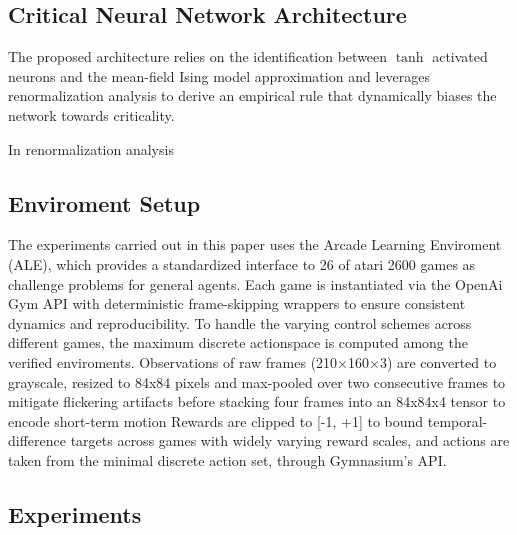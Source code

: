 \subsection{Critical Neural Network Architecture}

The proposed architecture relies on the identification between $\tanh$ activated neurons and the mean-field Ising model approximation and leverages renormalization analysis to derive an empirical rule that dynamically biases the network towards criticality.

In renormalization analysis

\subsection{Enviroment Setup}

The experiments carried out in this paper uses the Arcade Learning Enviroment (ALE), which provides a standardized interface to 26 of atari 2600 games as challenge problems for general agents\cite{Bellemare_2013}.
Each game is instantiated via the OpenAi Gym API with deterministic frame-skipping wrappers to ensure consistent dynamics and reproducibility.
To handle the varying control schemes across different games, the maximum discrete actionspace is computed among the verified enviroments.
Observations of raw frames (210×160×3) are converted to grayscale, resized to 84x84 pixels and max-pooled over two consecutive frames to mitigate flickering artifacts before stacking four  frames into an 84x84x4 tensor to encode short-term motion\cite{terry2020arcade}
Rewards are clipped to [-1, +1] to bound temporal-difference targets across games with widely varying reward scales, and actions are taken from the minimal discrete action set, through Gymnasium's API.

\subsection{Experiments}